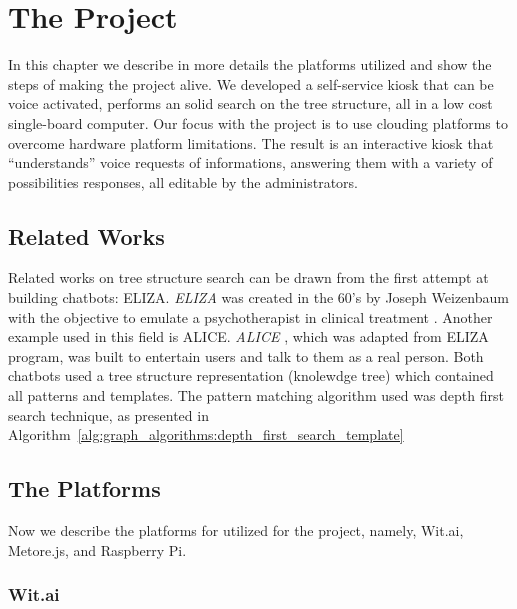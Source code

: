\chapter{The Project}
\label{sec:project}




In this chapter we describe in more details the platforms utilized and show the steps of making the project alive. 
We developed a self-service kiosk that can be voice activated, performs an solid search on the tree structure, all in a low cost  single-board computer.
Our focus with the project is to use clouding platforms to overcome hardware platform limitations.
The result is an interactive kiosk that ``understands'' voice requests of informations, answering them with a variety of possibilities responses, all editable by the administrators.


\section{Related Works}

Related works on tree structure search can be drawn from the first attempt at building chatbots: ELIZA.
\emph{ELIZA} was created in the 60’s by Joseph Weizenbaum with the objective to emulate a psychotherapist in clinical treatment \cite{weizenbaum1966eliza,weizenbaum1967contextual}. 
Another example used in this field is ALICE.
\emph{ALICE} \cite{schumaker2007evaluation}, which was adapted from ELIZA program, was built to entertain users and talk to them as a real person.
Both chatbots used a tree structure representation (knolewdge tree) which contained all patterns and templates.
The pattern matching algorithm used was depth first search technique, as presented in Algorithm~\ref{alg:graph_algorithms:depth_first_search_template}


\section{The Platforms}

Now we describe the platforms for utilized for the project, namely, Wit.ai, Metore.js, and Raspberry Pi.

\subsection{Wit.ai}

